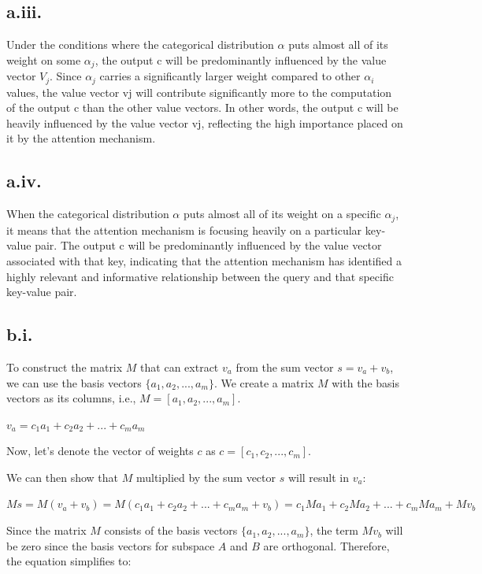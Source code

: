 \documentclass[a4paper]{article}
\begin{document}
\subsection*{a.iii.}

Under the conditions where the categorical distribution $\alpha$ puts almost all of its weight on some $\alpha_j$, the output c will be predominantly influenced by the value vector \(V_j\). Since $\alpha_j$ carries a significantly larger weight compared to other $\alpha_i$ values, the value vector vj will contribute significantly more to the computation of the output c than the other value vectors. In other words, the output c will be heavily influenced by the value vector vj, reflecting the high importance placed on it by the attention mechanism.

\subsection*{a.iv.}
When the categorical distribution $\alpha$ puts almost all of its weight on a specific $\alpha_j$, it means that the attention mechanism is focusing heavily on a particular key-value pair. The output c will be predominantly influenced by the value vector associated with that key, indicating that the attention mechanism has identified a highly relevant and informative relationship between the query and that specific key-value pair.

\subsection*{b.i.}
To construct the matrix $M$ that can extract $v_a$ from the sum vector $s = v_a + v_b$, we can use the basis vectors $\{a_1, a_2, ..., a_m\}$. We create a matrix $M$ with the basis vectors as its columns, i.e., $M = [a_1, a_2, ..., a_m]$.


\( v_a = c_1a_1 + c_2a_2 + ... + c_ma_m \)

Now, let's denote the vector of weights $c$ as $c = [c_1, c_2, ..., c_m]$.

We can then show that $M$ multiplied by the sum vector $s$ will result in $v_a$:

$Ms = M(v_a + v_b) = M(c_1a_1 + c_2a_2 + ... + c_ma_m + v_b) = c_1Ma_1 + c_2Ma_2 + ... + c_mMa_m + Mv_b$

Since the matrix $M$ consists of the basis vectors $\{a_1, a_2, ..., a_m\}$, the term $Mv_b$ will be zero since the basis vectors for subspace $A$ and $B$ are orthogonal. Therefore, the equation simplifies to:
\end{document}
